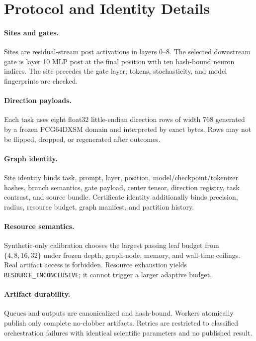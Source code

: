 \documentclass{article}
\begin{document}
\section{Protocol and Identity Details}
\label{app:protocol}
\paragraph{Sites and gates.}
Sites are residual-stream post activations in layers 0--8. The selected downstream gate is layer 10 MLP post at the final position with ten hash-bound neuron indices. The site precedes the gate layer; tokens, stochasticity, and model fingerprints are checked.

\paragraph{Direction payloads.}
Each task uses eight float32 little-endian direction rows of width 768 generated by a frozen PCG64DXSM domain and interpreted by exact bytes. Rows may not be flipped, dropped, or regenerated after outcomes.

\paragraph{Graph identity.}
Site identity binds task, prompt, layer, position, model/checkpoint/tokenizer hashes, branch semantics, gate payload, center tensor, direction registry, task contrast, and source bundle. Certificate identity additionally binds precision, radius, resource budget, graph manifest, and partition history.

\paragraph{Resource semantics.}
Synthetic-only calibration chooses the largest passing leaf budget from $\{4,8,16,32\}$ under frozen depth, graph-node, memory, and wall-time ceilings. Real artifact access is forbidden. Resource exhaustion yields \texttt{RESOURCE\_INCONCLUSIVE}; it cannot trigger a larger adaptive budget.

\paragraph{Artifact durability.}
Queues and outputs are canonicalized and hash-bound. Workers atomically publish only complete no-clobber artifacts. Retries are restricted to classified orchestration failures with identical scientific parameters and no published result.
\end{document}
